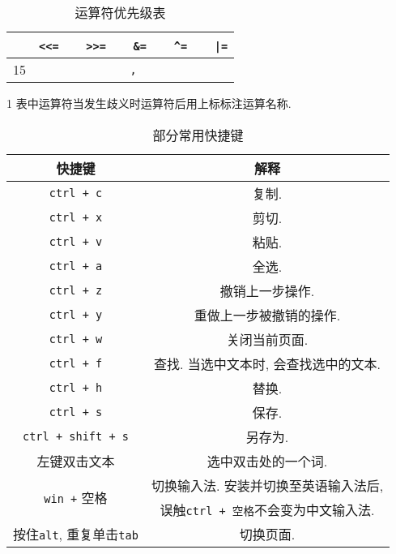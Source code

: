 \begin{table}[htbp]
\begin{threeparttable}
\begin{tabular}{|c|c|}
                        & \texttt{<<=} \ \ \ \texttt{>>=} \ \ \ \texttt{\&=} \ \ \ \texttt{\^{}=} \ \ \ \texttt{|=} \\
                \hline
                15      & \texttt{,} \\
                \hline
            \end{tabular}
            \begin{tablenotes}
                \item[1] 表中运算符当发生歧义时运算符后用上标标注运算名称.
            \end{tablenotes}
            \caption{运算符优先级表} \label{运算符优先级表} 
        \end{threeparttable}
    \end{table}

    \begin{table}[htbp]
        \centering
        \renewcommand\arraystretch{1.5}
        \begin{tabular}{|c|c|}
            \hline
            快捷键 & 解释 \\
            \hline \hline
            \texttt{ctrl + c} & 复制. \\
            \hline
            \texttt{ctrl + x} & 剪切. \\
            \hline
            \texttt{ctrl + v} & 粘贴. \\
            \hline
            \texttt{ctrl + a} & 全选. \\
            \hline
            \texttt{ctrl + z} & 撤销上一步操作. \\
            \hline
            \texttt{ctrl + y} & 重做上一步被撤销的操作. \\
            \hline
            \texttt{ctrl + w} & 关闭当前页面. \\
            \hline
            \texttt{ctrl + f} & 查找. 当选中文本时, 会查找选中的文本. \\
            \hline
            \texttt{ctrl + h} & 替换. \\
            \hline
            \texttt{ctrl + s} & 保存. \\
            \hline
            \texttt{ctrl + shift + s} & 另存为. \\
            \hline
            左键双击文本 & 选中双击处的一个词. \\
            \hline
            \multirow{2}{*}{\texttt{win +} 空格} & 切换输入法. 安装并切换至英语输入法后, \\
                                                & 误触\texttt{ctrl + 空格}不会变为中文输入法. \\
            \hline
            按住\texttt{alt}, 重复单击\texttt{tab} & 切换页面. \\
            \hline
        \end{tabular}
        \caption{部分常用快捷键} \label{部分常用快捷键} 
    \end{table}